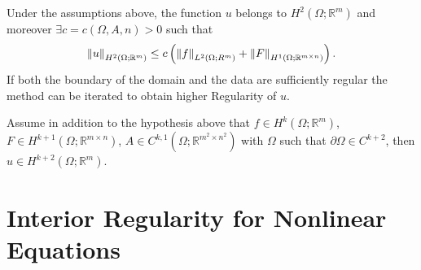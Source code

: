 \begin{thm}
	Under the assumptions above, the function \( u \) belongs to \( H^{2}(\Omega ; \mathbb{R}^{m})  \) and moreover \( \exists c = c(\Omega , A, n) > 0 \) such that
	\begin{gather}
		\left\lVert u\right\rVert_{H^{2}(\Omega ; \mathbb{R}^{m}) } \leq  c \left( \left\lVert f\right\rVert_{L^{2}(\Omega ; R^{m})} + \left\lVert F\right\rVert_{H^{1}(\Omega ; \mathbb{R}^{m \times n}) } \right).
	\end{gather}
	If both the boundary of the domain and the data are sufficiently regular the method can be iterated to obtain higher Regularity of \( u \).
\end{thm}

\begin{thm}[]
	Assume in addition to the hypothesis above that \( f \in  H^{k}(\Omega ; \mathbb{R}^{m})  \), \( F \in  H^{k+1}(\Omega ; \mathbb{R}^{m \times n})  \), \( A \in C^{k,1}(\Omega ; \mathbb{R}^{m^{2}\times n^{2}})  \) with \( \Omega  \) such that \( \partial \Omega \in C^{k+2} \), then \( u \in H^{k+2}(\Omega ; \mathbb{R}^{m})  \).
\end{thm}

\section{Interior Regularity for Nonlinear Equations}

